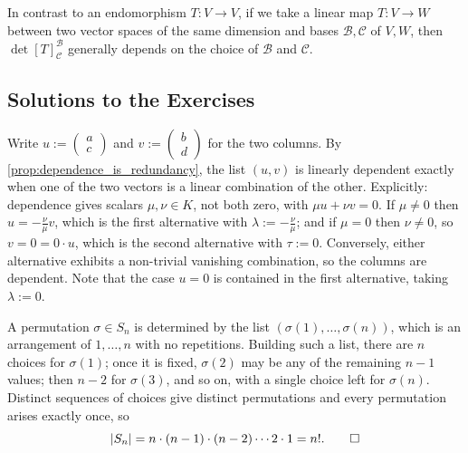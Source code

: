 \begin{importantremark}
  \label{rem:det_needs_endomorphism}
  In contrast to an endomorphism $T : V \to V$, if we take a linear map $T : V \to W$ between two vector spaces of the same dimension and bases $\mathcal{B}, \mathcal{C}$ of $V, W$, then $\det[T]_{\mathcal{C}}^{\mathcal{B}}$ generally depends on the choice of $\mathcal{B}$ and $\mathcal{C}$.
\end{importantremark}

\subsection{Solutions to the Exercises}
\label{sec:solutions_determinants}

\begin{exercisesolution}
\label{sol:lin_dep_2x2}
Write $u := \left(\begin{smallmatrix} a \\ c \end{smallmatrix}\right)$ and $v := \left(\begin{smallmatrix} b \\ d \end{smallmatrix}\right)$ for the two columns. By \cref{prop:dependence_is_redundancy}, the list $(u,v)$ is linearly dependent exactly when one of the two vectors is a linear combination of the other. Explicitly: dependence gives scalars $\mu, \nu \in K$, not both zero, with $\mu u + \nu v = 0$. If $\mu \neq 0$ then $u = -\frac{\nu}{\mu} v$, which is the first alternative with $\lambda := -\frac{\nu}{\mu}$; and if $\mu = 0$ then $\nu \neq 0$, so $v = 0 = 0 \cdot u$, which is the second alternative with $\tau := 0$. Conversely, either alternative exhibits a non-trivial vanishing combination, so the columns are dependent. Note that the case $u = 0$ is contained in the first alternative, taking $\lambda := 0$.
\end{exercisesolution}

\begin{exercisesolution}
\label{sol:size_of_Sn}
A permutation $\sigma \in S_n$ is determined by the list $(\sigma(1), \dots, \sigma(n))$, which is an arrangement of $1, \dots, n$ with no repetitions. Building such a list, there are $n$ choices for $\sigma(1)$; once it is fixed, $\sigma(2)$ may be any of the remaining $n-1$ values; then $n-2$ for $\sigma(3)$, and so on, with a single choice left for $\sigma(n)$. Distinct sequences of choices give distinct permutations and every permutation arises exactly once, so
\[
|S_n| = n \cdot (n-1) \cdot (n-2) \cdots 2 \cdot 1 = n!. \qedhere
\]
\end{exercisesolution}

